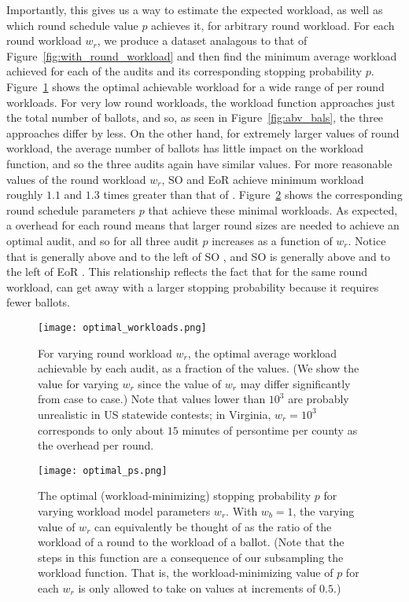 Importantly, this gives us a way to estimate the expected workload, as well as which round schedule value $p$ achieves it, for arbitrary round workload. For each round workload $w_r$, we produce a dataset analagous to that of Figure~\ref{fig:with_round_workload} and then find the minimum average workload achieved for each of the audits and its corresponding stopping probability $p$. 
Figure~\ref{fig:optimal_workloads} shows the optimal achievable workload for a wide range of per round workloads. For very low round workloads, the workload function approaches just the total number of ballots, and so, as seen in Figure~\ref{fig:abv_bals}, the three approaches differ by less. On the other hand, for extremely larger values of round workload, the average number of ballots has little impact on the workload function, and so the three audits again have similar values. For more reasonable values of the round workload $w_r$, SO \BRAVO and EoR \BRAVO achieve minimum workload roughly $1.1$ and $1.3$ times greater than that of \Providence.
Figure~\ref{fig:optimal_ps} shows the corresponding round schedule parameters $p$ that achieve these minimal workloads. As expected, a overhead for each round means that larger round sizes are needed to achieve an optimal audit, and so for all three audit $p$ increases as a function of $w_r$. Notice that \Providence is generally above and to the left of SO \BRAVO, and SO \BRAVO is generally above and to the left of EoR \BRAVO. This relationship reflects the fact that for the same round workload, \Providence can get away with a larger stopping probability because it requires fewer ballots.

\begin{figure}
\texttt{[image: optimal\_workloads.png]}
\caption{For varying round workload $w_r$, the optimal average workload achievable by each audit, as a fraction of the \Providence values. (We show the value for varying $w_r$ since the value of $w_r$ may differ significantly from case to case.) Note that values lower than $10^3$ are probably unrealistic in US statewide contests; in Virginia, $w_r=10^3$ corresponds to only about $15$ minutes of persontime per county as the overhead per round.}
\label{fig:optimal_workloads}
\end{figure}

\begin{figure}
\texttt{[image: optimal\_ps.png]}
\caption{The optimal (workload-minimizing) stopping probability $p$ for varying workload model parameters $w_r$. With $w_b=1$, the varying value of $w_r$ can equivalently be thought of as the ratio of the workload of a round to the workload of a ballot. (Note that the steps in this function are a consequence of our subsampling the workload function. That is, the workload-minimizing value of $p$ for each $w_r$ is only allowed to take on values at increments of $0.5$.)}
\label{fig:optimal_ps}
\end{figure}



